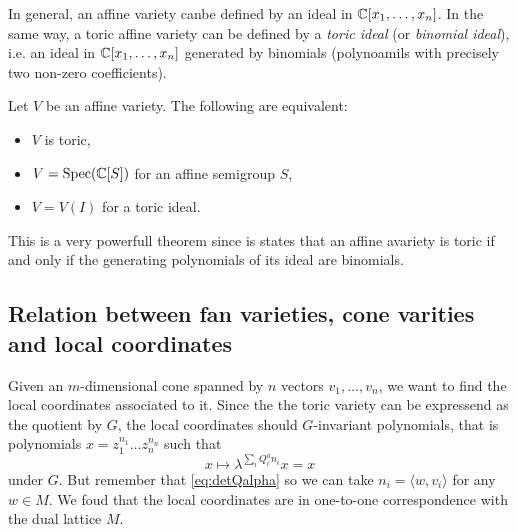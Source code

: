             In general, an affine variety canbe defined by an ideal in $\mathbb{C}[x_1,\dots,x_n]$. In the same way, a toric affine variety can be defined by a \emph{toric ideal} (or \emph{binomial ideal}), i.e. an ideal in $\mathbb{C}[x_1,\dots,x_n]$ generated by binomials (polynoamils with precisely two non-zero coefficients).
            \begin{theorem*}
                Let $V$ be an affine variety. The following are equivalent:
                \begin{itemize}
                    \item $V$ is toric,
                    \item $V=\text{Spec}(\mathbb{C}[S])$ for an affine semigroup $S$,
                    \item $V=V(I)$ for a toric ideal.
                \end{itemize}
            \end{theorem*}
            This is a very powerfull theorem since is states that an affine avariety is toric if and only if the generating polynomials of its ideal are binomials.


    \subsection{Relation between fan varieties, cone varities and local coordinates}

        Given an $m$-dimensional cone spanned by $n$ vectors $v_1,\dots,v_n$, we want to find the local coordinates associated to it. Since the the toric variety can be expressend as the quotient by $G$, the local coordinates should $G$-invariant polynomials, that is polynomials $x=z^{n_1}_1\dots z^{n_n}_n$ such that
        \begin{equation}
            x\mapsto \lambda^{\sum_i Q^a_i n_i}x=x
        \end{equation}
        under $G$. But remember that \eqref{eq:detQalpha} so we can take $n_i=\langle w,v_i\rangle$ for any $w\in M$. We foud that the local coordinates are in one-to-one correspondence with the dual lattice $M$.    
    
